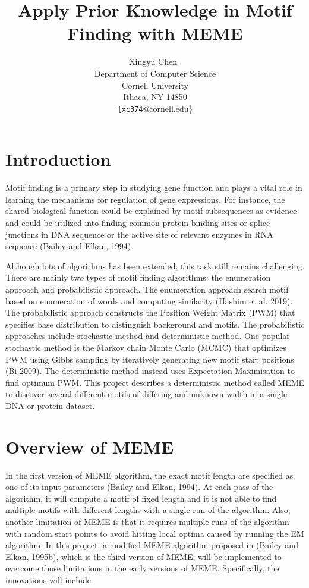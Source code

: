 \documentclass{article}
\title{Apply Prior Knowledge in Motif Finding with MEME}
\author{%
  Xingyu Chen\ \\
  Department of Computer Science\\
  Cornell University\\
  Ithaca, NY 14850 \\
  \texttt{\{xc374}@cornell.edu\}}
\begin{document}
\maketitle

\section{Introduction}

Motif finding is a primary step in studying gene function and plays a vital role in learning the mechanisms for regulation of gene expressions. For instance, the shared biological function could be explained by motif subsequences as evidence and could be utilized into finding common protein binding sites or splice junctions in DNA sequence or the active site of relevant enzymes in RNA sequence (Bailey and Elkan, 1994).

Although lots of algorithms has been extended, this task still remains challenging. There are mainly two types of motif finding algorithms: the enumeration approach and probabilistic approach. The enumeration approach search motif based on enumeration of words and computing similarity (Hashim et al. 2019). The probabilistic approach constructs the Position Weight Matrix (PWM) that specifies base distribution to distinguish background and motifs. The probabilistic approaches include stochastic method and deterministic method. One popular stochastic method is the Markov chain Monte Carlo (MCMC) that optimizes PWM using Gibbs sampling by iteratively generating new motif start positions (Bi 2009). The deterministic method instead uses Expectation Maximisation to find optimum PWM. This project describes a deterministic method called MEME to discover several different motifs of differing and unknown width in a single DNA or protein dataset. 


\section{Overview of MEME}
In the first version of MEME algorithm, the exact motif length are specified as one of its input parameters (Bailey and Elkan, 1994). At each pass of the algorithm, it will compute a motif of fixed length and it is not able to find multiple motifs with different lengths with a single run of the algorithm. Also, another limitation of MEME is that it requires multiple runs of the algorithm with random start points to avoid hitting local optima caused by running the EM algorithm.  In this project, a modified MEME algorithm proposed in (Bailey and Elkan, 1995b), which is the third version of MEME, will be implemented to overcome those limitations in the early versions of MEME. Specifically, the innovations will include 
\end{document}
